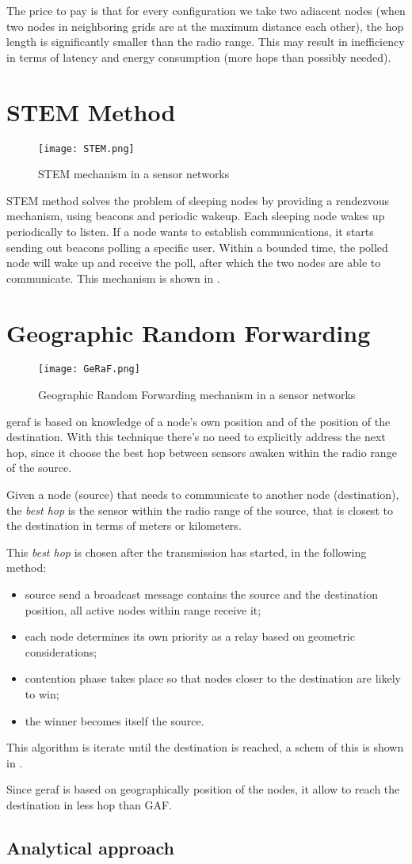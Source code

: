 The price to pay is that for every configuration we take two adiacent nodes (when two nodes in neighboring grids are at the maximum distance each other), the hop length is significantly smaller than the radio range. This may result in inefficiency in terms of latency and energy consumption (more hops than possibly needed).

\section{STEM Method}
\begin{figure}[h]
	\centering
	\texttt{[image: STEM.png]}
	\caption{STEM mechanism in a sensor networks}
	\label{fig:STEM}
\end{figure}
STEM method solves the problem of sleeping nodes by providing a rendezvous mechanism, using beacons and periodic wakeup.
Each sleeping node wakes up periodically to listen. If a node wants to establish communications, it starts sending out beacons polling a specific user. Within a bounded time, the polled node will wake up and receive the poll, after which the two nodes are able to communicate. This mechanism is shown in .

\section{Geographic Random Forwarding}
\begin{figure}[h]
	\centering
	\texttt{[image: GeRaF.png]}
	\caption{Geographic Random Forwarding mechanism in a sensor networks}
	\label{fig:GeRaF}
\end{figure}
\gls{geraf} is based on knowledge of a node’s own position and of the position of the destination.
With this technique there's no need to explicitly address the next hop, since it choose the best hop between sensors awaken within the radio range of the source.

Given a node (source) that needs to communicate to another node (destination), the \textit{best hop} is the sensor within the radio range of the source, that is closest to the destination in terms of meters or kilometers.

This \textit{best hop} is chosen after the transmission has started, in the following method:
\begin{itemize}
	\item source send a broadcast message contains the source and the destination position, all active nodes within range receive it;
	\item each node determines its own priority as a relay based on geometric considerations;
	\item contention phase takes place so that nodes closer to the destination are likely to win;
	\item the winner becomes itself the source.
\end{itemize}

This algorithm is iterate until the destination is reached, a schem of this is shown in .

Since \gls{geraf} is based on geographically position of the nodes, it allow to reach the destination in less hop than GAF.

\subsection{Analytical approach}
